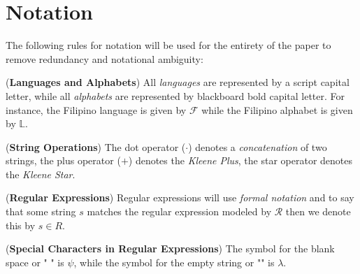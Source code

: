 \section{Notation}

The following rules for notation will be used for the entirety of the paper to remove redundancy and notational ambiguity:

\begin{thm_rule} (\textbf{Languages and Alphabets})
    All \emph{languages} are represented by a script capital letter, while all \emph{alphabets} are represented by blackboard bold capital letter. For instance, the Filipino language is given by \(\mathcal{F}\) while the Filipino alphabet is given by \(\mathbb{L}\).
\end{thm_rule}

\begin{thm_rule} (\textbf{String Operations})
    The dot operator (\(\cdot\)) denotes a \emph{concatenation} of two strings, the plus operator (\(+\)) denotes the \emph{Kleene Plus}, the star operator denotes the \emph{Kleene Star}.
\end{thm_rule}

\begin{thm_rule} (\textbf{Regular Expressions})
    Regular expressions will use \emph{formal notation} and to say that some string \(s\) matches the regular expression modeled by \(\mathcal{R}\) then we denote this by \(s \in R\).
\end{thm_rule}

\begin{thm_rule} (\textbf{Special Characters in Regular Expressions})
    The symbol for the blank space or " " is \(\psi\), while the symbol for the empty string or "" is \(\lambda\).
\end{thm_rule}

